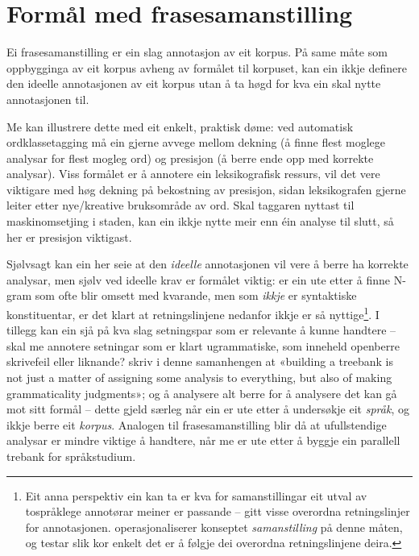 \documentclass[12pt,a4paper,oneside,draft]{report}
\begin{document}
\section{Formål med frasesamanstilling}
\label{sec-3.2}

\label{SEC:formaal}

Ei frasesamanstilling er ein slag annotasjon av eit korpus. På same
 måte som oppbygginga av eit korpus avheng av formålet til korpuset,
 kan ein ikkje definere den ideelle annotasjonen av eit korpus utan å
 ta høgd for kva ein skal nytte annotasjonen til.

Me kan illustrere dette med eit enkelt, praktisk døme: ved automatisk
 ordklassetagging må ein gjerne avvege mellom dekning (å finne flest
 moglege analysar for flest mogleg ord) og presisjon (å berre ende opp
 med korrekte analysar).  Viss formålet er å annotere ein
 leksikografisk ressurs, vil det vere viktigare med høg dekning på
 bekostning av presisjon, sidan leksikografen gjerne leiter etter
 nye/kreative bruksområde av ord. Skal taggaren nyttast til
 maskinomsetjing i staden, kan ein ikkje nytte meir enn éin analyse
 til slutt, så her er presisjon viktigast.

Sjølvsagt kan ein her seie at den \emph{ideelle} annotasjonen vil vere å
 berre ha korrekte analysar, men sjølv ved ideelle krav er formålet
 viktig: er ein ute etter å finne N-gram som ofte blir omsett med
 kvarande, men som \emph{ikkje} er syntaktiske konstituentar, er det klart
 at retningslinjene nedanfor ikkje er så nyttige\footnote{Eit anna perspektiv ein kan ta er kva for samanstillingar eit
        utval av tospråklege annotørar meiner er passande -- gitt
        visse overordna retningslinjer for
        annotasjonen. \citet{volk2008hjp} operasjonaliserer konseptet
        \emph{samanstilling} på denne måten, og testar slik kor enkelt det
        er å følgje dei overordna retningslinjene deira. }. I tillegg kan
 ein sjå på kva slag setningspar som er relevante å kunne handtere --
 skal me annotere setningar som er klart ugrammatiske, som inneheld
 openberre skrivefeil eller liknande? \citet[s.~158]{rosen2007tmt}
 skriv i denne samanhengen at «building a treebank is not just a
 matter of assigning some analysis to everything, but also of making
 grammaticality judgments»; og å analysere alt berre for å analysere
 det kan gå mot sitt formål -- dette gjeld særleg når ein er ute etter
 å undersøkje eit \emph{språk}, og ikkje berre eit \emph{korpus}. Analogen til
 frasesamanstilling blir då at ufullstendige analysar er mindre
 viktige å handtere, når me er ute etter å byggje ein parallell
 trebank for språkstudium.
\end{document}
